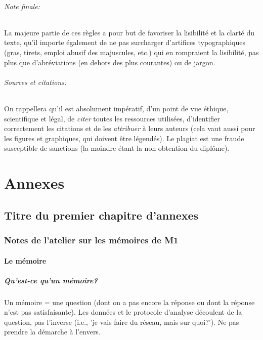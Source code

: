 \documentclass[a4paper,twoside,12pt]{book}
\begin{document}
\paragraph{Note finale:} La majeure partie de ces règles a pour but de favoriser la lisibilité et la clarté du texte, qu'il importe également de ne pas surcharger d'artifices typographiques (gras, tirets, emploi abusif des majuscules, etc.) qui en rompraient la lisibilité, pas plus que d'abréviations (en dehors des plus courantes) ou de jargon.

\paragraph{Sources et citations:} On rappellera qu'il est absolument impératif, d'un point de vue éthique, scientifique et légal, de \textit{citer} toutes les ressources utilisées, d'identifier correctement les citations et de les \textit{attribuer} à leurs auteurs (cela vaut aussi pour les figures et graphiques, qui doivent être légendés). Le plagiat est une fraude susceptible de sanctions (la moindre étant la non obtention du diplôme).



\appendix
\part*{Annexes}
\chapter{Titre du premier chapitre d'annexes}
\section{Notes de l'atelier sur les mémoires de M1}

\subsection{Le mémoire}\label{le-muxe9moire}

\subsubsection{Qu'est-ce qu'un mémoire?}\label{quest-ce-quun-muxe9moire}

Un mémoire = une question (dont on a pas encore la réponse ou dont la
réponse n'est pas satisfaisante). Les données et le protocole d'analyse découlent de la question, pas l'inverse (i.e., 'je vais faire du réseau, mais sur quoi?'). Ne pas prendre la démarche à l'envers.
\end{document}
